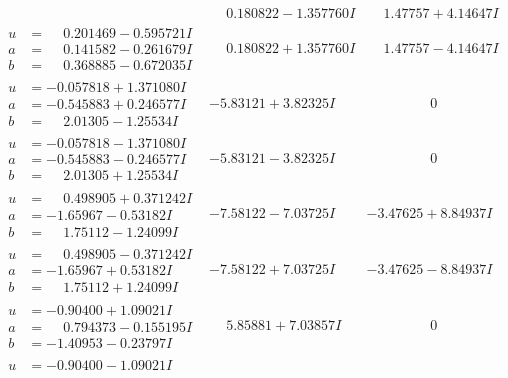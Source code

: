 \documentclass[1p]{elsarticle_modified}
\theoremstyle{definition}
\begin{document}
$$\begin{array}{c|c|c}
 & \phantom{-}0.180822 - 1.357760 I & \phantom{-}1.47757 + 4.14647 I \\ \hline\begin{aligned}
u &= \phantom{-}0.201469 - 0.595721 I \\
a &= \phantom{-}0.141582 - 0.261679 I \\
b &= \phantom{-}0.368885 - 0.672035 I\end{aligned}
 & \phantom{-}0.180822 + 1.357760 I & \phantom{-}1.47757 - 4.14647 I \\ \hline\begin{aligned}
u &= -0.057818 + 1.371080 I \\
a &= -0.545883 + 0.246577 I \\
b &= \phantom{-}2.01305 - 1.25534 I\end{aligned}
 & -5.83121 + 3.82325 I & \phantom{-0.000000 } 0 \\ \hline\begin{aligned}
u &= -0.057818 - 1.371080 I \\
a &= -0.545883 - 0.246577 I \\
b &= \phantom{-}2.01305 + 1.25534 I\end{aligned}
 & -5.83121 - 3.82325 I & \phantom{-0.000000 } 0 \\ \hline\begin{aligned}
u &= \phantom{-}0.498905 + 0.371242 I \\
a &= -1.65967 - 0.53182 I \\
b &= \phantom{-}1.75112 - 1.24099 I\end{aligned}
 & -7.58122 - 7.03725 I & -3.47625 + 8.84937 I \\ \hline\begin{aligned}
u &= \phantom{-}0.498905 - 0.371242 I \\
a &= -1.65967 + 0.53182 I \\
b &= \phantom{-}1.75112 + 1.24099 I\end{aligned}
 & -7.58122 + 7.03725 I & -3.47625 - 8.84937 I \\ \hline\begin{aligned}
u &= -0.90400 + 1.09021 I \\
a &= \phantom{-}0.794373 - 0.155195 I \\
b &= -1.40953 - 0.23797 I\end{aligned}
 & \phantom{-}5.85881 + 7.03857 I & \phantom{-0.000000 } 0 \\ \hline\begin{aligned}
u &= -0.90400 - 1.09021 I \\

\end{aligned}
\end{array}$$
\end{document}
